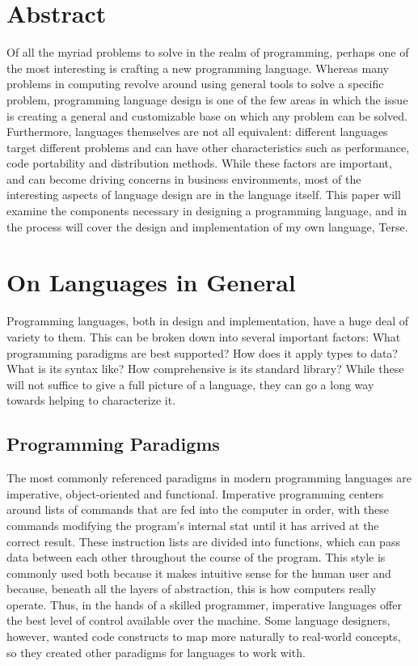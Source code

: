 \documentclass[12pt]{article}
\begin{document}
\listoftodos
\section{Abstract}

Of all the myriad problems to solve in the realm of programming,
perhaps one of the most interesting is crafting a new programming
language. Whereas many problems in computing revolve around using
general tools to solve a specific problem, programming language design
is one of the few areas in which the issue is creating a general and
customizable base on which any problem can be solved. Furthermore,
languages themselves are not all equivalent: different languages
target different problems and can have other characteristics such as
performance, code portability and distribution methods. While these
factors are important, and can become driving concerns in business
environments, most of the interesting aspects of language design are
in the language itself. This paper will examine the components
necessary in designing a programming language, and in the process will
cover the design and implementation of my own language, Terse.

\clearpage

\section{On Languages in General}

Programming languages, both in design and implementation, have a huge
deal of variety to them. This can be broken down into several
important factors: What programming paradigms are best supported? How
does it apply types to data? What is its syntax like? How
comprehensive is its standard library? While these will not suffice to
give a full picture of a language, they can go a long way towards
helping to characterize it.

\subsection{Programming Paradigms}

The most commonly referenced paradigms in modern programming languages
are imperative, object-oriented and functional. Imperative programming
centers around lists of commands that are fed into the computer in
order, with these commands modifying the program's internal stat until
it has arrived at the correct result. These instruction lists are
divided into functions, which can pass data between each other
throughout the course of the program. This style is commonly used both
because it makes intuitive sense for the human user and because,
beneath all the layers of abstraction, this is how computers really
operate. Thus, in the hands of a skilled programmer, imperative
languages offer the best level of control available over the
machine. Some language designers, however, wanted code constructs to
map more naturally to real-world concepts, so they created other
paradigms for languages to work with.
\end{document}

